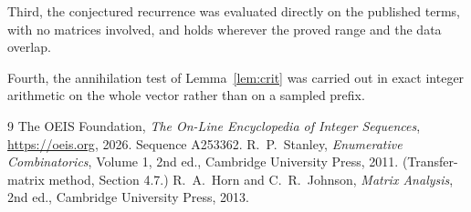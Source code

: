 \documentclass[11pt,a4paper]{article}
\theoremstyle{plain}
\theoremstyle{definition}
\begin{document}
Third, the conjectured recurrence was evaluated directly on the published terms, with no
matrices involved, and holds wherever the proved range and the data overlap.

Fourth, the annihilation test of Lemma~\ref{lem:crit} was carried out in exact integer
arithmetic on the whole vector rather than on a sampled prefix.

\begin{thebibliography}{9}
 The OEIS Foundation, \emph{The On-Line Encyclopedia of Integer
Sequences}, \url{https://oeis.org}, 2026. Sequence A253362.
 R.~P.~Stanley, \emph{Enumerative Combinatorics}, Volume 1, 2nd ed.,
Cambridge University Press, 2011. (Transfer-matrix method, Section 4.7.)
 R.~A.~Horn and C.~R.~Johnson, \emph{Matrix Analysis}, 2nd ed., Cambridge
University Press, 2013.
\end{thebibliography}
\end{document}
